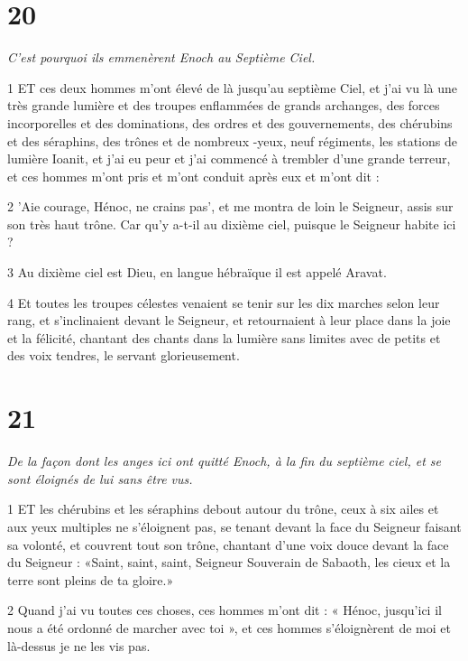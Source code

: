 \chapter{20}

\par \textit{C'est pourquoi ils emmenèrent Enoch au Septième Ciel.}

\par 1 ET ces deux hommes m'ont élevé de là jusqu'au septième Ciel, et j'ai vu là une très grande lumière et des troupes enflammées de grands archanges, des forces incorporelles et des dominations, des ordres et des gouvernements, des chérubins et des séraphins, des trônes et de nombreux -yeux, neuf régiments, les stations de lumière Ioanit, et j'ai eu peur et j'ai commencé à trembler d'une grande terreur, et ces hommes m'ont pris et m'ont conduit après eux et m'ont dit :

\par 2 'Aie courage, Hénoc, ne crains pas', et me montra de loin le Seigneur, assis sur son très haut trône. Car qu’y a-t-il au dixième ciel, puisque le Seigneur habite ici ?

\par 3 Au dixième ciel est Dieu, en langue hébraïque il est appelé Aravat.

\par 4 Et toutes les troupes célestes venaient se tenir sur les dix marches selon leur rang, et s'inclinaient devant le Seigneur, et retournaient à leur place dans la joie et la félicité, chantant des chants dans la lumière sans limites avec de petits et des voix tendres, le servant glorieusement.

\chapter{21}

\par \textit{De la façon dont les anges ici ont quitté Enoch, à la fin du septième ciel, et se sont éloignés de lui sans être vus.}

\par 1 ET les chérubins et les séraphins debout autour du trône, ceux à six ailes et aux yeux multiples ne s'éloignent pas, se tenant devant la face du Seigneur faisant sa volonté, et couvrent tout son trône, chantant d'une voix douce devant la face du Seigneur : «Saint, saint, saint, Seigneur Souverain de Sabaoth, les cieux et la terre sont pleins de ta gloire.»

\par 2 Quand j'ai vu toutes ces choses, ces hommes m'ont dit : « Hénoc, jusqu'ici il nous a été ordonné de marcher avec toi », et ces hommes s'éloignèrent de moi et là-dessus je ne les vis pas.


